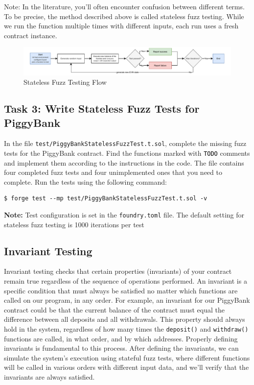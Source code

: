 \documentclass[12pt]{article}
\newcommand{\codegrey}[1]{%
  \texttt{\colorbox{black!4}{\textcolor{black}{#1}}}%
}
\begin{document}
\noindent
Note: In the literature, you'll often encounter confusion between different terms. To be precise, the method described above is called stateless fuzz testing. While we run the function multiple times with different inputs, each run uses a fresh contract instance.

\begin{figure}[h!]
    \centering
    \includegraphics[width=1\textwidth]{fuzz-testing.pdf}
    \caption{Stateless Fuzz Testing Flow}\label{fig:fuzz-testing}
\end{figure}

\subsection*{Task 3: Write Stateless Fuzz Tests for PiggyBank}

In the file \texttt{test/PiggyBankStatelessFuzzTest.t.sol}, complete the
missing fuzz tests for the PiggyBank contract. Find the functions marked with
\codegrey{TODO} comments and implement them according to the instructions in
the code. The file contains four completed fuzz tests and four unimplemented
ones that you need to complete. Run the tests using the following command:

\noindent \begin{minipage}{\textwidth}
    \begin{verbatim}
$ forge test --mp test/PiggyBankStatelessFuzzTest.t.sol -v
\end{verbatim}
\end{minipage}

\noindent
\textbf{Note:} Test configuration is set in the \texttt{foundry.toml} file. The default setting for stateless fuzz testing is 1000 iterations per test

\subsection{Invariant Testing}

Invariant testing checks that certain properties (invariants) of your contract
remain true regardless of the sequence of operations performed. An invariant is
a specific condition that must always be satisfied no matter which functions
are called on our program, in any order. For example, an invariant for our
PiggyBank contract could be that the current balance of the contract must equal
the difference between all deposits and all withdrawals. This property should
always hold in the system, regardless of how many times the \texttt{deposit()}
and \texttt{withdraw()} functions are called, in what order, and by which
addresses. Properly defining invariants is fundamental to this process. After
defining the invariants, we can simulate the system's execution using stateful
fuzz tests, where different functions will be called in various orders with
different input data, and we'll verify that the invariants are always satisfied.
\end{document}
